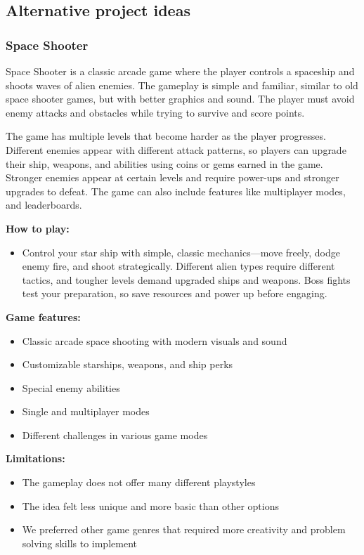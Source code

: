 \documentclass[12pt]{article}
\begin{document}
\subsection{Alternative project ideas}

\subsubsection{Space Shooter}

Space Shooter is a classic arcade game where the player controls a spaceship and shoots waves of alien enemies.\parencite{spaceinvaders,galaga} The gameplay is simple and familiar, similar to old space shooter games, but with better graphics and sound. The player must avoid enemy attacks and obstacles while trying to survive and score points.

The game has multiple levels that become harder as the player progresses. Different enemies appear with different attack patterns, so players can upgrade their ship, weapons, and abilities using coins or gems earned in the game. Stronger enemies appear at certain levels and require power-ups and stronger upgrades to defeat. The game can also include features like multiplayer modes, and leaderboards.
\vspace{4pt}

\noindent\textbf{How to play:}
\begin{itemize}
\item Control your star ship with simple, classic mechanics—move freely, dodge enemy fire, and shoot strategically. Different alien types require different tactics, and tougher levels demand upgraded ships and weapons. Boss fights test your preparation, so save resources and power up before engaging.
\end{itemize}

\noindent\textbf{Game features:}
\begin{itemize}
\item Classic arcade space shooting with modern visuals and sound
\item Customizable starships, weapons, and ship perks
\item Special enemy abilities
\item Single and multiplayer modes
\item Different challenges in various game modes
\end{itemize}

\noindent\textbf{Limitations:}
\begin{itemize}
\item The gameplay does not offer many different playstyles
\item The idea felt less unique and more basic than other options
\item We preferred other game genres that required more creativity and problem solving skills to implement
\end{itemize}
\end{document}
